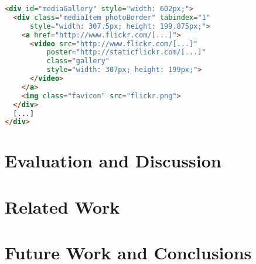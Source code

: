 \documentclass{sig-alternate}
\begin{document}
\begin{lstlisting}[caption={Simplified \emph{Strict Order, Equal Size}
  HTML code}, label=code:mediagalleryhtml, language=HTML]
<div id="mediaGallery" style="width: 602px;">
  <div class="mediaItem photoBorder" tabindex="1"
      style="width: 307.5px; height: 199.875px;">
    <a href="http://www.flickr.com/[...]">
      <video src="http://www.flickr.com/[...]"
          poster="http://staticflickr.com/[...]"
          class="gallery"
          style="width: 307px; height: 199px;">
      </video>
    </a>
    <img class="favicon" src="flickr.png">
  </div>
  [...]
</div>
\end{lstlisting}

\section{Evaluation and Discussion}

\section{Related Work}

\section{Future Work and Conclusions}



\balancecolumns
\end{document}
